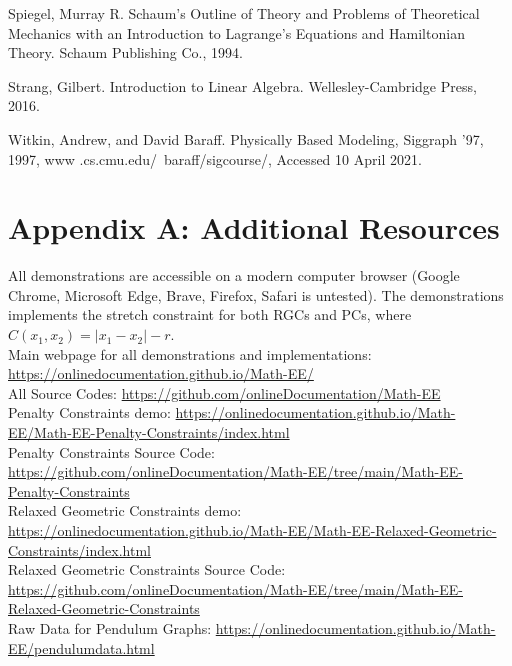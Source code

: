\documentclass[12pt, letterpaper]{article}
\begin{document}
Spiegel, Murray R. Schaum's Outline of Theory and Problems of Theoretical Mechanics with an Introduction to Lagrange's Equations and Hamiltonian Theory. Schaum Publishing Co., 1994. 

Strang, Gilbert. Introduction to Linear Algebra. Wellesley-Cambridge Press, 2016. 

Witkin, Andrew, and David Baraff. Physically Based Modeling, Siggraph '97, 1997, www .cs.cmu.edu/~baraff/sigcourse/, Accessed 10 April 2021. 

\clearpage
\indent
\vspace{-2em}
\setlength{\parindent}{-0.5in}
\setlength{\leftskip}{0cm}

\section{Appendix A: Additional Resources}
All demonstrations are accessible on a modern computer browser (Google Chrome, Microsoft Edge, Brave, Firefox, Safari is untested). The demonstrations implements the stretch constraint for both RGCs and PCs, where $C(x_{1},x_{2}) = |x_{1}-x_{2}|-r$.\\

\noindent Main webpage for all demonstrations and implementations: 
\url{https://onlinedocumentation.github.io/Math-EE/}\\

\noindent All Source Codes:  \url{https://github.com/onlineDocumentation/Math-EE} \\

\noindent Penalty Constraints demo: \url{https://onlinedocumentation.github.io/Math-EE/Math-EE-Penalty-Constraints/index.html} \\

\noindent Penalty Constraints Source Code: \url{https://github.com/onlineDocumentation/Math-EE/tree/main/Math-EE-Penalty-Constraints} \\

\noindent Relaxed Geometric Constraints demo: \url{https://onlinedocumentation.github.io/Math-EE/Math-EE-Relaxed-Geometric-Constraints/index.html}\\

\noindent Relaxed Geometric  Constraints Source Code: \url{https://github.com/onlineDocumentation/Math-EE/tree/main/Math-EE-Relaxed-Geometric-Constraints}\\

\noindent Raw Data for Pendulum Graphs: \url{https://onlinedocumentation.github.io/Math-EE/pendulumdata.html }
\end{document}

